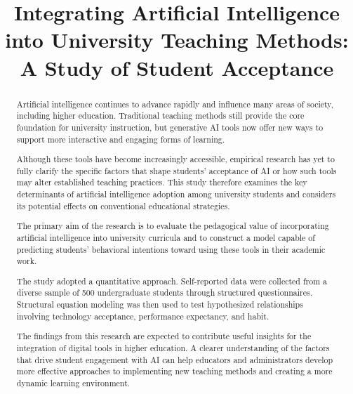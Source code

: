 \documentclass[12pt, a4paper]{article}
\title{\textbf{Integrating Artificial Intelligence into University Teaching Methods: A Study of Student Acceptance}}
\author{}
\date{}
\begin{document}
\maketitle
\vspace{-4em}

\begin{abstract}
\noindent Artificial intelligence continues to advance rapidly and influence many areas of society, including higher education. Traditional teaching methods still provide the core foundation for university instruction, but generative AI tools now offer new ways to support more interactive and engaging forms of learning.

Although these tools have become increasingly accessible, empirical research has yet to fully clarify the specific factors that shape students’ acceptance of AI or how such tools may alter established teaching practices. This study therefore examines the key determinants of artificial intelligence adoption among university students and considers its potential effects on conventional educational strategies.

The primary aim of the research is to evaluate the pedagogical value of incorporating artificial intelligence into university curricula and to construct a model capable of predicting students’ behavioral intentions toward using these tools in their academic work.

The study adopted a quantitative approach. Self-reported data were collected from a diverse sample of 500 undergraduate students through structured questionnaires. Structural equation modeling was then used to test hypothesized relationships involving technology acceptance, performance expectancy, and habit.

The findings from this research are expected to contribute useful insights for the integration of digital tools in higher education. A clearer understanding of the factors that drive student engagement with AI can help educators and administrators develop more effective approaches to implementing new teaching methods and creating a more dynamic learning environment.
\end{abstract}
\end{document}
